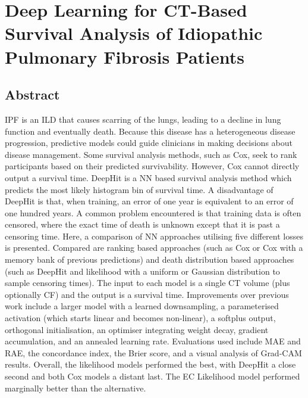 \chapter{Deep Learning for CT-Based Survival Analysis of Idiopathic Pulmonary Fibrosis Patients} \label{sec:deep_learning_for_ct_based_survival_analysis_of_idiopathic_pulmonary_fibrosis_patients_appendix}
    \newpage

    \section{Abstract} \label{sec:deep_learning_for_ct_based_survival_analysis_of_idiopathic_pulmonary_fibrosis_patients_appendix_abstract}
        \gls{IPF} is an \gls{ILD} that causes scarring of the lungs, leading to a decline in lung function and eventually death. Because this disease has a heterogeneous disease progression, predictive models could guide clinicians in making decisions about disease management. Some survival analysis methods, such as Cox, seek to rank participants based on their predicted survivability. However, Cox cannot directly output a survival time. DeepHit is a \gls{NN} based survival analysis method which predicts the most likely histogram bin of survival time. A disadvantage of DeepHit is that, when training, an error of one year is equivalent to an error of one hundred years. A common problem encountered is that training data is often censored, where the exact time of death is unknown except that it is past a censoring time. Here, a comparison of \gls{NN} approaches utilising five different losses is presented. Compared are ranking based approaches (such as Cox or Cox with a memory bank of previous predictions) and death distribution based approaches (such as DeepHit and likelihood with a uniform or Gaussian distribution to sample censoring times). The input to each model is a single \gls{CT} volume (plus optionally \gls{CF}) and the output is a survival time. Improvements over previous work include a larger model with a learned downsampling, a parameterised activation (which starts linear and becomes non-linear), a softplus output, orthogonal initialisation, an optimiser integrating weight decay, gradient accumulation, and an annealed learning rate. Evaluations used include \gls{MAE} and \gls{RAE}, the concordance index, the Brier score, and a visual analysis of \gls{Grad-CAM} results. Overall, the likelihood models performed the best, with DeepHit a close second and both Cox models a distant last. The \gls{EC} Likelihood model performed marginally better than the alternative.

